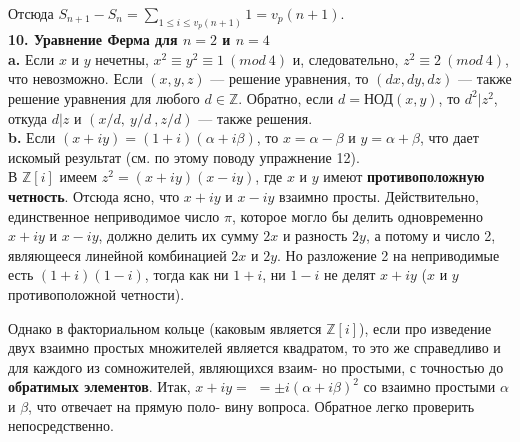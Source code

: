 Отсюда $S_{n+1}-S_n=\sum_{1\leqslant i\leqslant v_p(n+1)}1=v_p(n+1)$.\newline
\\
\noindent\textbf{10. Уравнение Ферма для $n=2$ и $n=4$} \newline 
\\
\hspace*{15pt}\textbf{a.} Если $x$ и $y$ нечетны,\:\: $x^2\equiv y^2\equiv 1~(mod~4)$\:\: и, следовательно,\linebreak
$z^2\equiv 2~(mod~4)$, что невозможно. Если $(x,y,z)$ — решение уравнения,\linebreak
то $(dx,dy,dz)$ — также решение уравнения для любого $d\in \mathbb{Z}$. Обратно,\linebreak
если $d=\text{НОД}(x,y)$, то $d^2|z^2$, откуда $d|z$ и $(x/d,~y/d~,z/d)$ — также\linebreak
решения.\newline
\\
\hspace*{15pt}\textbf{b.} Если $(x+iy)=(1+i)(\alpha+i\beta)$, то $x=\alpha-\beta$ и $y=\alpha+\beta$, что дает\linebreak
искомый результат (см. по этому поводу упражнение 12).\\

В $\mathbb{Z}[i]$ имеем $z^2=(x+iy)(x-iy)$, где $x$ и $y$ имеют \textbf{противоположную}\linebreak
\textbf{четность}. Отсюда ясно, что $x+iy$ и $x-iy$ взаимно просты.\linebreak
Действительно, единственное неприводимое число $\pi$, которое мог­ло бы\linebreak
делить одновременно $x+iy$ и $x-iy$, должно делить их сумму $2x$\linebreak
%
%
\noindent и разность $2y$, а потому и число 2, являющееся линейной комбинацией\linebreak
$2x$ и $2y$. Но разложение 2 на неприводимые есть $(1+i)(1-i)$, тогда как\linebreak 
ни $1+i$, ни $1-i$ не делят $x+iy$ ($x$ и $y$ противоположной четности).

Однако в факториальном кольце (каковым является $\mathbb{Z}[i]$), если про\linebreak
изведение двух взаимно простых множителей является квадратом, то\linebreak
это же справедливо и для каждого из сомножителей, являющихся взаим-\linebreak
но простыми, с точностью до \textbf{обратимых элементов}. Итак, $x+iy=$\linebreak
$=\pm i(\alpha+i\beta)^2$ со взаимно простыми $\alpha$ и $\beta$, что отвечает на прямую поло-\linebreak
вину вопроса. Обратное легко проверить непосредственно.

